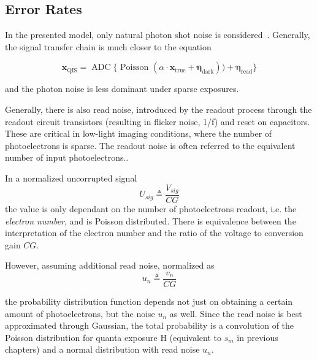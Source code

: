 
\subsection{Error Rates}
In the presented model, only natural photon shot noise is considered~\cite{Feng_Yang_2012, s16111961}. Generally, the signal transfer chain is much closer to the equation

\begin{equation}\boldsymbol{x}_{\mathrm{QIS}}=\operatorname{ADC}\{\text { Poisson }(\alpha \cdot \boldsymbol{x}_{\text {true}}+\boldsymbol{\eta}_{\mathrm{dark}}))+\boldsymbol{\eta}_{\mathrm{read}}\}\end{equation}

and the photon noise is less dominant under sparse exposures. 

Generally, there is also read noise, introduced by the readout process through the readout circuit transistors (resulting in flicker noise, 1/f) and reset on capacitors. These are critical in low-light imaging conditions, where the number of photoelectrons is sparse. The readout noise is often referred to the equivalent number of input photoelectrons.\cite{7422662}. 

In a normalized uncorrupted signal \begin{equation}
U_{s i g} \triangleq \frac{V_{s i g}}{C G}
\end{equation}
the value is only dependant on the number of photoelectrons readout, i.e. the \textit{electron number}, and is Poisson distributed. There is equivalence between the interpretation of the electron number and the ratio of the voltage to conversion gain $CG$.

However, assuming additional read noise, normalized as
\begin{equation}
    u_{n} \triangleq \frac{v_{n}}{C G}
\end{equation}

the probability distribution function depends not just on obtaining a certain amount of photoelectrons, but the noise $u_{n}$ as well. Since the read noise is best approximated through Gaussian, the total probability is a convolution of the Poisson distribution for quanta exposure H (equivalent to $s_m$ in previous chapters) and a normal distribution with read noise $u_n$. 

